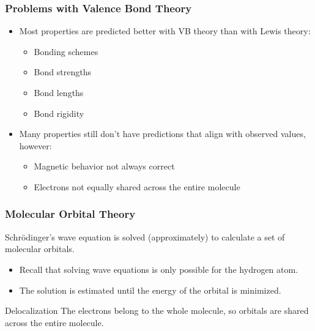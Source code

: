 \documentclass[handout]{beamer}
\begin{document}

\clearpage

\begin{frame}[t]
	\frametitle{Problems with Valence Bond Theory}
	\begin{itemize}[<+->]
		\item Most properties are predicted better with VB theory than
			with Lewis theory:
			\begin{itemize}[<1->]
				\item Bonding schemes
				\item Bond strengths
				\item Bond lengths
				\item Bond rigidity
			\end{itemize}
		\item Many properties still don't have predictions that align
			with observed values, however:
			\begin{itemize}[<1->]
				\item Magnetic behavior not always correct
				\item Electrons not equally shared across the
					entire molecule
			\end{itemize}
	\end{itemize}
\end{frame}

\begin{frame}[t]
	\frametitle{Molecular Orbital Theory}
	Schrödinger's wave equation is solved (approximately) to calculate a set
	of \alert{molecular} orbitals.
	\begin{itemize}[<+->]
		\item Recall that solving wave equations is only possible for
			the hydrogen atom.
		\item The solution is estimated until the energy of the orbital
			is \alert{minimized}.
	\end{itemize}

	\onslide<+->
	\bigskip

	\begin{block}{Delocalization}
		The electrons belong to the \alert{whole} molecule, so orbitals
		are shared across the \alert{entire} molecule.
	\end{block}
\end{frame}
\end{document}
